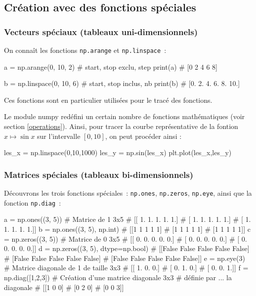 \documentclass[10pt,fleqn]{article} %
\begin{document}
\subsection{Création avec des fonctions spéciales}

\subsubsection{Vecteurs spéciaux (tableaux uni-dimensionnels)}
On connaît les fonctions \texttt{np.arange} et \texttt{np.linspace}~: 

\begin{multicols}{2}
\begin{python}
a = np.arange(0, 10, 2) # start, stop exclu, step
print(a)
# [0 2 4 6 8]
\end{python}
\begin{python}
b = np.linspace(0, 10, 6) # start, stop inclus, nb
print(b)
# [0. 2. 4. 6. 8. 10.]  
\end{python}
\end{multicols}


Ces fonctions sont en particulier utilisées pour le tracé des
fonctions.  %

\begin{exemple}
Le module numpy redéfini un certain nombre de fonctions mathématiques (voir section \ref{operations}). Ainsi, pour tracer la courbe représentative de la fontion $x\mapsto \sin x$ sur l'intervalle $[0,10]$, on peut procéder ainsi : 
\begin{python}
les_x = np.linspace(0,10,1000)
les_y = np.sin(les_x)
plt.plot(les_x,les_y)
\end{python}
\end{exemple}


\subsubsection{Matrices spéciales (tableaux bi-dimensionnels)}

Découvrons les trois fonctions spéciales~: \texttt{np.ones},
\texttt{np.zeros}, \texttt{np.eye}, ainsi que la fonction \texttt{np.diag}~:

\begin{multicols}{2}
\begin{python}
a = np.ones((3, 5)) # Matrice de 1 3x5
# [[ 1.  1.  1.  1.  1.]
#  [ 1.  1.  1.  1.  1.]
#  [ 1.  1.  1.  1.  1.]]
b = np.ones((3, 5), np.int)
# [[1 1 1 1 1]
#  [1 1 1 1 1]
#  [1 1 1 1 1]]
c = np.zeros((3, 5)) # Matrice de 0 3x5
# [[ 0.  0.  0.  0.  0.]
#  [ 0.  0.  0.  0.  0.]
#  [ 0.  0.  0.  0.  0.]]
d = np.zeros((3, 5), dtype=np.bool)
# [[False False False False False]
#  [False False False False False]
#  [False False False False False]]
e = np.eye(3) # Matrice diagonale de 1 de taille 3x3
# [[ 1.  0.  0.]
#  [ 0.  1.  0.]
#  [ 0.  0.  1.]]  
f = np.diag([1,2,3]) # Création d'une matrice diagonale 3x3
#  définie par ... la diagonale
# [[1 0 0]
#  [0 2 0]
#  [0 0 3]]
\end{python}
\end{multicols}
\end{document}
